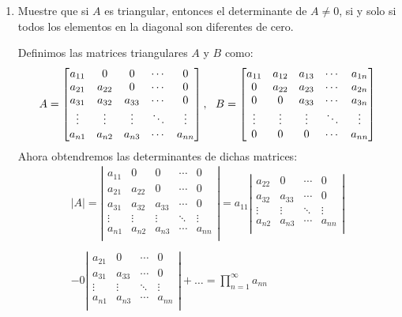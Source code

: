 \documentclass[12pt,titlepage]{article}
\begin{document}
\begin{enumerate}
\clearpage
\item 	Muestre que si $A$ es triangular, entonces el determinante de $A\not=0$, si y solo si todos los elementos en la diagonal son diferentes de cero.
\par \parskip 8mm
Definimos las matrices triangulares $A$ y $B$ como:
\begin{equation} \setcounter{equation}{1}
    A=\left[\begin{matrix}a_{11}&0&0&\cdots&0\\a_{21}&a_{22}&0&\cdots&0\\a_{31}&a_{32}&a_{33}&\cdots&0\\\vdots&\vdots&\vdots&\ddots&\vdots\\a_{n1}&a_{n2}&a_{n3}&\cdots&a_{nn}\\\end{matrix}\right],\ \ B=\left[\begin{matrix}a_{11}&a_{12}&a_{13}&\cdots&a_{1n}\\0&a_{22}&a_{23}&\cdots&a_{2n}\\0&0&a_{33}&\cdots&a_{3n}\\\vdots&\vdots&\vdots&\ddots&\vdots\\0&0&0&\cdots&a_{nn}\\\end{matrix}\right]\nonumber
\end{equation}
Ahora obtendremos las determinantes de dichas matrices:
\begin{gather}
     \left|A\right|=\left|\begin{matrix}a_{11}&0&0&\cdots&0\\a_{21}&a_{22}&0&\cdots&0\\a_{31}&a_{32}&a_{33}&\cdots&0\\\vdots&\vdots&\vdots&\ddots&\vdots\\a_{n1}&a_{n2}&a_{n3}&\cdots&a_{nn}\\\end{matrix}\right|=a_{11}\left|\begin{matrix}a_{22}&0&\cdots&0\\a_{32}&a_{33}&\cdots&0\\\vdots&\vdots&\ddots&\vdots\\a_{n2}&a_{n3}&\cdots&a_{nn}\\\end{matrix}\right|\nonumber\\\nonumber\\
     -0\left|\begin{matrix}a_{21}&0&\cdots&0\\a_{31}&a_{33}&\cdots&0\\\vdots&\vdots&\ddots&\vdots\\a_{n1}&a_{n3}&\cdots&a_{nn}\\\end{matrix}\right|+\ldots=\prod_{n=1}^{\infty}a_{nn}\nonumber  

\end{gather}
\end{enumerate}
\end{document}

